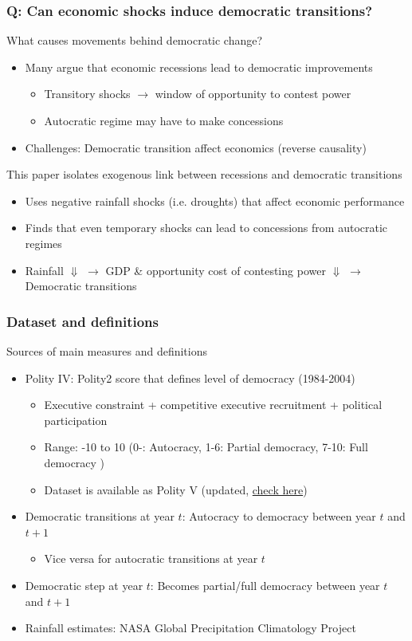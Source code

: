 \documentclass[aspectratio=169]{beamer}
\begin{document}
\begin{frame}
\frametitle{Q: Can economic shocks induce democratic transitions?} 
What causes movements behind democratic change?
\begin{itemize}\setlength\itemsep{3pt}
\item Many argue that economic recessions lead to democratic improvements
\begin{itemize}\setlength\itemsep{3pt}
\item Transitory shocks $\to$ window of opportunity to contest power
\item Autocratic regime may have to make concessions
\end{itemize}
\item Challenges: Democratic transition affect economics (reverse causality)
\end{itemize}\medskip
This paper isolates exogenous link between recessions and democratic transitions
\begin{itemize}\setlength\itemsep{3pt}
\item Uses negative rainfall shocks (i.e. droughts) that affect economic performance
\item Finds that even temporary shocks can lead to concessions from autocratic regimes
\item Rainfall $\Downarrow$ $\to$ GDP \& opportunity cost of contesting power $\Downarrow$ $\to$ Democratic transitions
\end{itemize}
\end{frame}

\begin{frame}
\frametitle{Dataset and definitions} 
Sources of main measures and definitions
\begin{itemize}\setlength\itemsep{3pt}
\item Polity IV: Polity2 score that defines level of democracy (1984-2004)
\begin{itemize}\setlength\itemsep{3pt}
\item Executive constraint + competitive executive recruitment + political participation
\item Range: -10 to 10 (0-: Autocracy, 1-6: Partial democracy, 7-10: Full democracy )
\item Dataset is available as Polity V (updated, \hyperlink{https://www.systemicpeace.org/polityproject.html}{check here}) 
\end{itemize}
\item Democratic transitions at year $t$: Autocracy to democracy between year $t$ and $t+1$
\begin{itemize}
\item Vice versa for autocratic transitions at year $t$
\end{itemize}
\item Democratic step at year $t$: Becomes partial/full democracy between year $t$ and $t+1$
\item Rainfall estimates: NASA Global Precipitation Climatology Project 
\end{itemize}
\end{frame}
\end{document}
